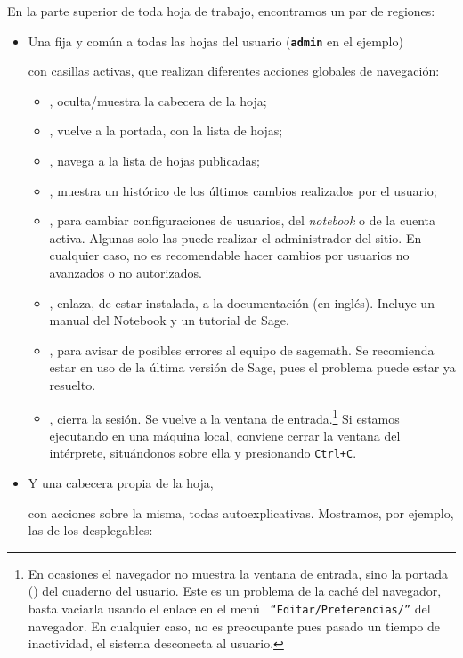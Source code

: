 En la parte superior de toda hoja de trabajo, encontramos un par de regiones:
\begin{itemize}
 \item Una fija y común a todas las hojas del usuario %
 (\textbf{\small\lstinline|admin|} en el ejemplo) 

con casillas activas, que realizan diferentes acciones globales de navegación:
\begin{itemize}
 \item {}, oculta/muestra la cabecera de la hoja;
 \item {}, vuelve a la portada, con la lista de hojas;
 \item {}, navega a la lista de hojas publicadas;
 \item {}, muestra un histórico de los últimos cambios realizados por
el usuario;
\item {}, para cambiar configuraciones de usuarios, del
\emph{notebook} o de la cuenta activa. Algunas solo las puede realizar el
administrador del sitio. En cualquier caso, no es recomendable hacer cambios
por usuarios no avanzados o no autorizados.
\item {}, enlaza, de estar instalada, a la documentación (en inglés).
Incluye un manual del Notebook y un tutorial de Sage.
\item {}, para avisar de posibles errores al equipo de
sagemath. Se recomienda estar en uso de la última versión de Sage, pues el
problema puede estar ya resuelto.
\item {}, cierra la sesión. Se vuelve a la ventana de
entrada.\footnote{En ocasiones el navegador no muestra la ventana de entrada,
sino la portada () del cuaderno del usuario. Este es un problema de
la caché del navegador, basta vaciarla usando el enlace en el men\'u {\tt
``Editar/Preferencias/''} del navegador. En cualquier caso, no es preocupante
pues pasado un tiempo de inactividad, el sistema desconecta al usuario.}
Si estamos ejecutando en una máquina local, conviene cerrar la ventana del
intérprete, situándonos sobre ella y presionando \verb|Ctrl+C|.
\end{itemize}



\item Y una cabecera propia de la hoja, 

con acciones sobre la misma, todas autoexplicativas. Mostramos, por ejemplo,
las de los desplegables:
\newcommand{\imagitem}[2]{\item
\raisebox{.5\baselineskip}{\raisebox{-#1\textheight}{
\makebox[1\width][l]
	{\texttt{[image: Desplegable\#2.png]}%
}}}}


\end{itemize}

